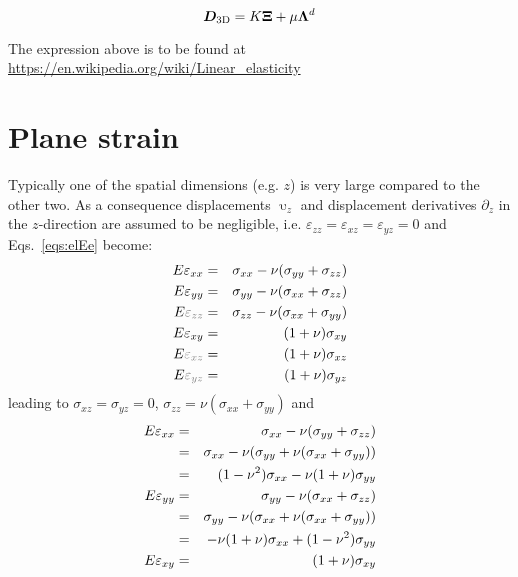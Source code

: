 \begin{mdframed}[backgroundcolor=blue!5]
\[
{\bm D}_{\rm 3D}  =K {\bm \Xi} + \mu {\bm \Lambda}^d
\]
\end{mdframed}

The expression above is to be found at \url{https://en.wikipedia.org/wiki/Linear_elasticity}



\newpage
\section{Plane strain \label{ss:elpstrain}}
Typically one of the spatial dimensions (e.g. $z$)
is very large compared to the other two. 
As a consequence displacements $\upupsilon_z$ and 
displacement derivatives $\partial_z$ in the 
$z$-direction are assumed to be negligible, i.e. $\varepsilon_{zz}=\varepsilon_{xz}=\varepsilon_{yz}=0$
and Eqs.~\eqref{eqs:elEe} become:
\begin{eqnarray}
E \varepsilon_{xx} &=&  \sigma_{xx} - \nu (\sigma_{yy}+\sigma_{zz}) \nn\\
E \varepsilon_{yy} &=&  \sigma_{yy} - \nu (\sigma_{xx}+\sigma_{zz}) \nn\\
E {\color{gray}\varepsilon_{zz}} &=&  \sigma_{zz} - \nu (\sigma_{xx}+\sigma_{yy}) \nn\\
E \varepsilon_{xy} &=&  (1+\nu) \sigma_{xy} \nn\\
E {\color{gray}\varepsilon_{xz}} &=&  (1+\nu) \sigma_{xz} \nn\\
E {\color{gray}\varepsilon_{yz}} &=&  (1+\nu) \sigma_{yz} \nn 
\end{eqnarray}
leading to $\sigma_{xz}=\sigma_{yz}=0$, $\sigma_{zz}=\nu(\sigma_{xx}+\sigma_{yy})$
and
\begin{eqnarray}
E \varepsilon_{xx} 
&=&  \sigma_{xx} - \nu (\sigma_{yy}+\sigma_{zz}) \nonumber\\
&=&  \sigma_{xx} - \nu (\sigma_{yy}+ \nu(\sigma_{xx}+\sigma_{yy})) \nonumber\\
&=& (1-\nu^2) \sigma_{xx} - \nu (1+\nu ) \sigma_{yy} \nonumber\\
E \varepsilon_{yy} 
&=&  \sigma_{yy} - \nu (\sigma_{xx}+\sigma_{zz}) \nonumber\\
&=&  \sigma_{yy} - \nu (\sigma_{xx}+ \nu(\sigma_{xx}+\sigma_{yy})) \nonumber\\
&=& -\nu(1+\nu) \sigma_{xx} + (1-\nu^2) \sigma_{yy} \nonumber\\
E \varepsilon_{xy} &=&  (1+\nu) \sigma_{xy} \nonumber
\end{eqnarray}
